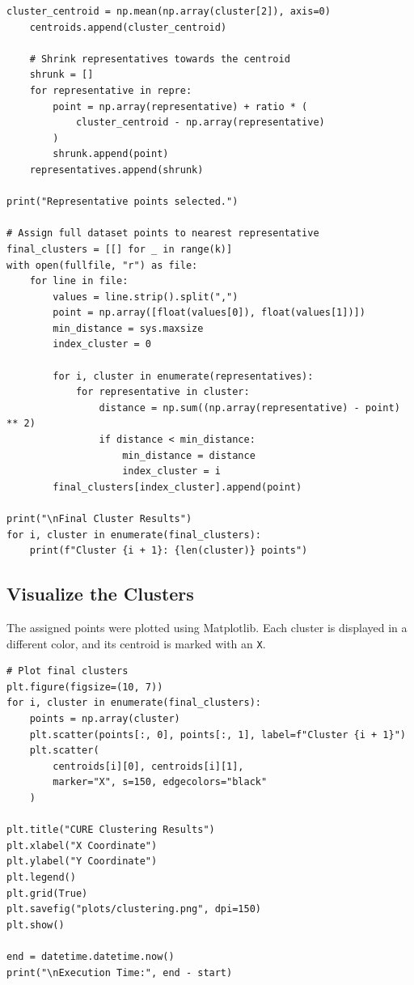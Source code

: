\documentclass[11pt,a4paper]{article}
\begin{document}
\begin{lstlisting}[style=pythonstyle]
    cluster_centroid = np.mean(np.array(cluster[2]), axis=0)
    centroids.append(cluster_centroid)

    # Shrink representatives towards the centroid
    shrunk = []
    for representative in repre:
        point = np.array(representative) + ratio * (
            cluster_centroid - np.array(representative)
        )
        shrunk.append(point)
    representatives.append(shrunk)

print("Representative points selected.")

# Assign full dataset points to nearest representative
final_clusters = [[] for _ in range(k)]
with open(fullfile, "r") as file:
    for line in file:
        values = line.strip().split(",")
        point = np.array([float(values[0]), float(values[1])])
        min_distance = sys.maxsize
        index_cluster = 0

        for i, cluster in enumerate(representatives):
            for representative in cluster:
                distance = np.sum((np.array(representative) - point) ** 2)
                if distance < min_distance:
                    min_distance = distance
                    index_cluster = i
        final_clusters[index_cluster].append(point)

print("\nFinal Cluster Results")
for i, cluster in enumerate(final_clusters):
    print(f"Cluster {i + 1}: {len(cluster)} points")
\end{lstlisting}

\subsection{Visualize the Clusters}
The assigned points were plotted using Matplotlib. Each cluster is displayed in a different color, and its centroid is marked with an \texttt{X}.

\begin{lstlisting}[style=pythonstyle]
# Plot final clusters
plt.figure(figsize=(10, 7))
for i, cluster in enumerate(final_clusters):
    points = np.array(cluster)
    plt.scatter(points[:, 0], points[:, 1], label=f"Cluster {i + 1}")
    plt.scatter(
        centroids[i][0], centroids[i][1],
        marker="X", s=150, edgecolors="black"
    )

plt.title("CURE Clustering Results")
plt.xlabel("X Coordinate")
plt.ylabel("Y Coordinate")
plt.legend()
plt.grid(True)
plt.savefig("plots/clustering.png", dpi=150)
plt.show()

end = datetime.datetime.now()
print("\nExecution Time:", end - start)
\end{lstlisting}
\end{document}

